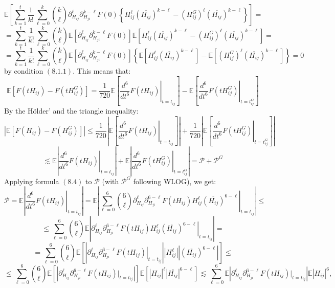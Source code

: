 \documentclass[11pt]{article}
\begin{document}
$$\mathbb{E}\left[\sum_{k=1}^t\frac{1}{k!}\sum_{\ell=0}^k \binom{k}{\ell}\partial_{H_{ij}}^\ell \partial_{H_{ji}}^{k-\ell} F(0) \left\{H_{ij}^\ell \left(\overline{H_{ij}}\right)^{k-\ell}-(H_{ij}^G)^\ell \left(\overline{H_{ij}}\right)^{k-\ell}\right\}\right]=$$
$$=\sum_{k=1}^t\frac{1}{k!}\sum_{\ell=0}^k \binom{k}{\ell}\mathbb{E}\left[\partial_{H_{ij}}^\ell \partial_{H_{ji}}^{k-\ell} F(0) \right]\mathbb{E}\left[H_{ij}^\ell \left(\overline{H_{ij}}\right)^{k-\ell}-(H_{ij}^G)^\ell \left(\overline{H_{ij}}\right)^{k-\ell}\right]=$$
$$=\sum_{k=1}^t\frac{1}{k!}\sum_{\ell=0}^k \binom{k}{\ell}\mathbb{E}\left[\partial_{H_{ij}}^\ell \partial_{H_{ji}}^{k-\ell} F(0) \right]\left\{\mathbb{E}\left[H_{ij}^\ell \left(\overline{H_{ij}}\right)^{k-\ell}\right]-\mathbb{E}\left[(H_{ij}^G)^\ell \left(\overline{H_{ij}}\right)^{k-\ell}\right]\right\}=0$$
by condition $(8.1.1)$. This means that:
$$\mathbb{E}\left[F(tH_{ij})-F(tH_{ij}^G)\right]=\frac{1}{720} \mathbb{E}\left[\left.\frac{d^6}{dt^6}F(tH_{ij})\right\vert_{t=t_{ij}}\right]-\mathbb{E}\left[\left.\frac{d^6}{dt^6}F(tH_{ij}^G)\right\vert_{t=t_{ij}^G}\right]$$
By the Hölder' and the triangle inequality: 
$$\left\vert \mathbb{E}\left[ F(H_{ij}) - F(H_{ij}^G)\right] \right\vert\leq \frac{1}{720} \left\vert\mathbb{E}\left[\left.\frac{d^6}{dt^6}F(tH_{ij})\right\vert_{t=t_{ij}}\right]\right\vert+\frac{1}{720}\left\vert\mathbb{E}\left[\left.\frac{d^6}{dt^6}F(tH_{ij}^G)\right\vert_{t=t_{ij}^G}\right]\right\vert $$
$$\lesssim \mathbb{E}\left\vert\left.\frac{d^6}{dt^6}F(tH_{ij})\right\vert_{t=t_{ij}}\right\vert+\mathbb{E}\left\vert\left.\frac{d^6}{dt^6}F(tH_{ij}^G)\right\vert_{t=t_{ij}^G}\right\vert = \mathcal{P} + \mathcal{P}^G$$
Applying formula $(8.4)$ to $\mathcal{P}$ (with $\mathcal{P}^G$ following WLOG), we get:
$$\mathcal{P} = \mathbb{E}\left\vert\left.\frac{d^6}{dt^6}F(tH_{ij})\right\vert_{t=t_{ij}}\right\vert  = \mathbb{E}\left\vert  \left.\sum_{\ell=0}^6 \binom{6}{\ell}\partial_{H_{ij}}^\ell \partial_{H_{ji}}^{6-\ell} F(tH_{ij})H_{ij}^\ell \left(\overline{H_{ij}}\right)^{6-\ell}\right\vert_{t=t_{ij}}\right\vert\leq $$
$$\leq \sum_{\ell=0}^6 \binom{6}{\ell}\mathbb{E}\left\vert \left.
\partial_{H_{ij}}^\ell \partial_{H_{ji}}^{6-\ell} F(tH_{ij})H_{ij}^\ell \left(\overline{H_{ij}}\right)^{6-\ell}\right\vert_{t=t_{ij}}
\right\vert=$$
$$ = \sum_{\ell=0}^6 \binom{6}{\ell}\mathbb{E}\left[\left\vert \left.
\partial_{H_{ij}}^\ell \partial_{H_{ji}}^{6-\ell} F(tH_{ij})\right\vert _{t=t_{ij}}\right\vert
\left\vert H_{ij}^\ell \right\vert \left\vert \left(\overline{H_{ij}}\right)^{6-\ell}
\right\vert \right]\leq $$
\begin{equation*}\leq \sum_{\ell=0}^6\binom{6}{\ell} \mathbb{E}\left[ \left\vert \partial_{H_{ij}}^\ell \partial_{H_{ji}}^{6-\ell} F(tH_{ij})|_{t=t_{ij}}\right\vert\right] \mathbb{E}\left[|H_{ij}|^\ell \left\vert \overline{H_{ij}}\right\vert^{6-\ell}\right]\lesssim \sum_{\ell=0}^6 \mathbb{E}\left\vert \partial_{H_{ij}}^\ell \partial_{H_{ji}}^{6-\ell} F(tH_{ij})|_{t=t_{ij}}\right\vert\mathbb{E}|H_{ij}|^6,\tag{8.5.1}\end{equation*}
\end{document}
